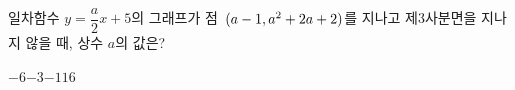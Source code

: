 일차함수 $y=\dfrac{a}{2}x+5$의 그래프가 점~$(a-1{,}\mkern3mu a^2+2a+2)$를 지나고 제$3$사분면을 지나지 않을 때, 상수 $a$의 값은?
\begin{choices32}{$-6$}{$-3$}{$-1$}{$1$}{$6$}\end{choices32}
